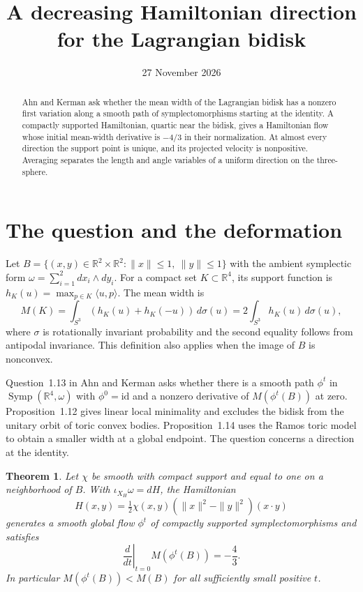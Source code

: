 \documentclass[11pt,a4paper]{amsart}
\title[A Hamiltonian direction for the Lagrangian bidisk]{A decreasing Hamiltonian direction for the Lagrangian bidisk}
\date{27 November 2026}
\newtheorem{theorem}{Theorem}
\newcommand{\R}{\mathbb R}
\newcommand{\Symp}{\operatorname{Symp}}
\newcommand{\ip}[2]{\langle #1,#2\rangle}
\begin{document}
\begin{abstract}
Ahn and Kerman ask whether the mean width of the Lagrangian bidisk has a nonzero first variation along a smooth path of symplectomorphisms starting at the identity. A compactly supported Hamiltonian, quartic near the bidisk, gives a Hamiltonian flow whose initial mean-width derivative is $-4/3$ in their normalization. At almost every direction the support point is unique, and its projected velocity is nonpositive. Averaging separates the length and angle variables of a uniform direction on the three-sphere.
\end{abstract}
\maketitle

\section{The question and the deformation}
Let $B=\{(x,y)\in\R^2\times\R^2:\|x\|\le1,\ \|y\|\le1\}$ with the ambient symplectic form $\omega=\sum_{i=1}^2 dx_i\wedge dy_i$. For a compact set $K\subset\R^4$, its support function is $h_K(u)=\max_{p\in K}\ip{u}{p}$. The mean width is
\[
 M(K)=\int_{S^3}(h_K(u)+h_K(-u))\,d\sigma(u)
     =2\int_{S^3}h_K(u)\,d\sigma(u),
\]
where $\sigma$ is rotationally invariant probability and the second equality follows from antipodal invariance. This definition also applies when the image of $B$ is nonconvex.

Question~1.13 in Ahn and Kerman \cite[p.~4]{variations} asks whether there is a smooth path $\phi^t$ in $\Symp(\R^4,\omega)$ with $\phi^0=\mathrm{id}$ and a nonzero derivative of $M(\phi^t(B))$ at zero. Proposition~1.12 gives linear local minimality and excludes the bidisk from the unitary orbit of toric convex bodies. Proposition~1.14 uses the Ramos toric model \cite[Theorem~3]{ramos} to obtain a smaller width at a global endpoint. The question concerns a direction at the identity.

\begin{theorem}\label{thm:main}
Let $\chi$ be smooth with compact support and equal to one on a neighborhood of $B$. With $\iota_{X_H}\omega=dH$, the Hamiltonian
\[
 H(x,y)=\tfrac12\chi(x,y)(\|x\|^2-\|y\|^2)(x\cdot y)
\]
generates a smooth global flow $\phi^t$ of compactly supported symplectomorphisms and satisfies
\[
                  \left.\frac{d}{dt}\right|_{t=0}M(\phi^t(B))=-\frac43 .
\]
In particular $M(\phi^t(B))<M(B)$ for all sufficiently small positive $t$.
\end{theorem}
\end{document}
